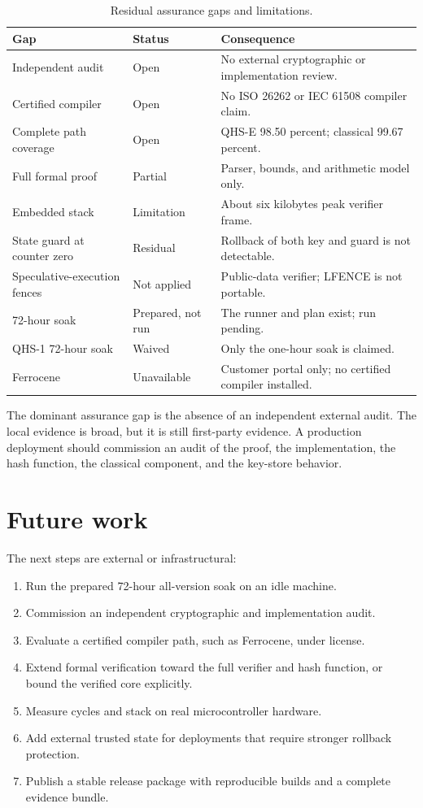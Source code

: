 \documentclass[11pt,a4paper]{article}
\theoremstyle{remark}
\begin{document}
\begin{table}[ht]
\centering
\caption{Residual assurance gaps and limitations.}
\label{tab:gaps}
\small
\begin{tabularx}{\textwidth}{@{}p{3.6cm}p{2.0cm}Y@{}}
\toprule
Gap & Status & Consequence\\
\midrule
Independent audit & Open & No external cryptographic or implementation review.\\
Certified compiler & Open & No ISO 26262 or IEC 61508 compiler claim.\\
Complete path coverage & Open & QHS-E 98.50 percent; classical 99.67 percent.\\
Full formal proof & Partial & Parser, bounds, and arithmetic model only.\\
Embedded stack & Limitation & About six kilobytes peak verifier frame.\\
State guard at counter zero & Residual & Rollback of both key and guard is not detectable.\\
Speculative-execution fences & Not applied & Public-data verifier; LFENCE is not portable.\\
72-hour soak & Prepared, not run & The runner and plan exist; run pending.\\
QHS-1 72-hour soak & Waived & Only the one-hour soak is claimed.\\
Ferrocene & Unavailable & Customer portal only; no certified compiler installed.\\
\bottomrule
\end{tabularx}
\end{table}

The dominant assurance gap is the absence of an independent external audit. The
local evidence is broad, but it is still first-party evidence. A production
deployment should commission an audit of the proof, the implementation, the
hash function, the classical component, and the key-store behavior.

\section{Future work}

The next steps are external or infrastructural:

\begin{enumerate}
  \item Run the prepared 72-hour all-version soak on an idle machine.
  \item Commission an independent cryptographic and implementation audit.
  \item Evaluate a certified compiler path, such as Ferrocene, under license.
  \item Extend formal verification toward the full verifier and hash function, or
  bound the verified core explicitly.
  \item Measure cycles and stack on real microcontroller hardware.
  \item Add external trusted state for deployments that require stronger
  rollback protection.
  \item Publish a stable release package with reproducible builds and a complete
  evidence bundle.
\end{enumerate}
\end{document}
